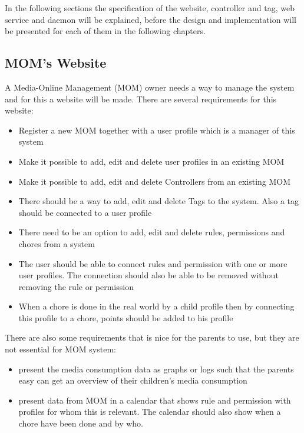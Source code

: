 In the following sections the specification of the website, controller and tag, web service and daemon will be explained, before the design and implementation will be presented for each of them in the following chapters.  

\subsection{MOM's Website}
\label{subsection:momswebsite}
A Media-Online Management (MOM) owner needs a way to manage the system and for this a website will be made. There are several requirements for this website:

\begin{itemize}
	\item Register a new MOM together with a user profile which is a manager of this system
	\item Make it possible to add, edit and delete user profiles in an existing MOM 
	\item Make it possible to add, edit and delete Controllers from an existing MOM
	\item There should be a way to add, edit and delete Tags to the system. Also a tag should be connected to a user profile
	\item There need to be an option to add, edit and delete rules, permissions and chores from a system
	\item The user should be able to connect rules and permission with one or more user profiles. The connection should also be able to be removed without removing the rule or permission
	\item When a chore is done in the real world by a child profile then by connecting this profile to a chore, points should be added to his profile
\end{itemize}

There are also some requirements that is nice for the parents to use, but they are not essential for MOM system:

\begin{itemize}
	\item present the media consumption data as graphs or logs such that the parents easy can get an overview of their children's media consumption 
	\item present data from MOM in a calendar that shows rule and permission with profiles for whom this is relevant. The calendar should also show when a chore have been done and by who.
\end{itemize}


